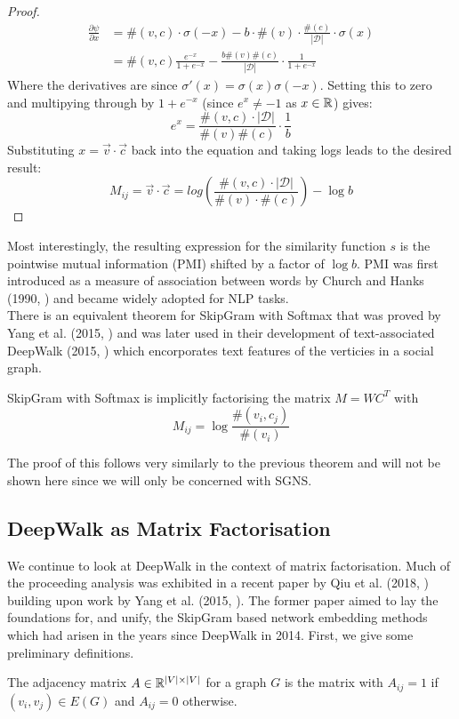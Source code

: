 \documentclass[a4paper]{article}
\newcommand{\D}{\mathcal D}
\begin{document}
\begin{proof}
\begin{align*}
  \frac{\partial{\psi}}{\partial{x}} &= \#(v, c) \cdot \sigma(-x) - b \cdot
    \#(v) \cdot \frac{\#(c)}{|\D|} \cdot \sigma(x)\\
    &= \#(v,c)\frac{e^{-x}}{1+e^{-x}} -\frac{b\#(v)\#(c)}{|\D|} \cdot \frac{1}{1+e^{-x}}
  \end{align*}
  Where the derivatives are since $\sigma'(x) = \sigma(x)\sigma(-x)$. Setting
  this to zero and multipying through by
  $1+e^{-x}$ (since $e^{x} \neq -1$ as $x \in \R$) gives:
  \[e^x = \frac{\#(v,c) \cdot |\D|}{\#(v)\#(c)} \cdot \frac{1}{b}\]
  Substituting $x = \vec{v} \cdot \vec{c}$ back into the equation and taking
  logs leads to the desired result:
  \[M_{ij} = \vec{v} \cdot \vec{c} = log{\left( \frac{\#(v, c) \cdot |\D|}{\#(v) \cdot
          \#(c)} \right)} - \log{b}\]
\end{proof}
\noindent Most interestingly, the resulting expression for the similarity function $s$ is
the pointwise mutual information (PMI) shifted by a factor of $\log b$. PMI was
first introduced as a measure of association between words by Church and Hanks
(1990, \cite{church1990}) and became widely adopted for NLP tasks.\\
There is an equivalent theorem for SkipGram with Softmax that was proved by Yang
et al. (2015, \cite{yangalternative2015}) and was later used in their development of
text-associated DeepWalk (2015, \cite{yang2015}) which encorporates text features
of the verticies in a social graph.

\begin{theorem}[Yang et al. (2015)]
  SkipGram with Softmax is implicitly factorising the matrix $M = WC^T$ with
  \[M_{ij} = \log{\frac{\#(v_i,c_j)}{\#(v_i)}}\]
\end{theorem}
The proof of this follows very similarly to the previous theorem and will not be
shown here since we will only be concerned with SGNS.

\subsection{DeepWalk as Matrix Factorisation}
We continue to look at DeepWalk in the context of matrix factorisation. Much of the proceeding analysis was exhibited in a recent paper by Qiu et
al. (2018, \cite{qiu2018}) building upon work by Yang et al. (2015, \cite{yang2015}). The former paper aimed to lay the foundations for, and
unify, the SkipGram based network embedding methods which had arisen in the years since DeepWalk in 2014. First, we give some preliminary definitions.
\begin{definition}
  The adjacency matrix $A \in \R^{|V| \times |V|}$ for a graph $G$ is the matrix with $A_{ij} = 1$ if $(v_i, v_j) \in E(G)$ and $A_{ij} = 0$ otherwise.
\end{definition}
\end{document}
